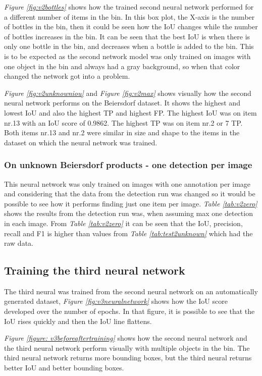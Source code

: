 \textit{Figure \ref{fig:v2bottles}} shows how the trained second neural network performed for a different number of items in the bin. In this box plot, the X-axis is the number of bottles in the bin, then it could be seen how the IoU changes while the number of bottles increases in the bin. It can be seen that the best IoU is when there is only one bottle in the bin, and decreases when a bottle is added to the bin. This is to be expected as the second network model was only trained on images with one object in the bin and always had a gray background, so when that color changed the network got into a problem.

\textit{Figure \ref{fig:v2unknowniou}} and \textit{Figure \ref{fig:v2max}} shows visually how the second neural network performs on the Beiersdorf dataset. It shows the highest and lowest IoU and also the highest TP and highest FP. The highest IoU was on item nr.13 with an IoU score of 0.9862. The highest TP was on item nr.2 or 7 TP. Both items nr.13 and nr.2 were similar in size and shape to the items in the dataset on which the neural network was trained.

\subsubsection{On unknown Beiersdorf products - one detection per image}
This neural network was only trained on images with one annotation per image and considering that the data from the detection run was changed so it would be possible to see how it performs finding just one item per image. \textit{Table \ref{tab:v2zero}} shows the results from the detection run was, when assuming max one detection in each image. From \textit{Table \ref{tab:v2zero}} it can be seen that the IoU, precision, recall and F1 is higher than values from \textit{Table \ref{tab:test2unknown}} which had the raw data.


\subsection{Training the third neural network}
The third neural was trained from the second neural network on an automatically generated dataset, \textit{Figure \ref{fig:v3neuralnetwork}} shows how the IoU score developed over the number of epochs. In that figure, it is possible to see that the IoU rises quickly and then the IoU line flattens.

\textit{Figure \ref{figure: v3beforeaftertraining}} shows how the second neural network and the third neural network perform visually with multiple objects in the bin. The third neural network returns more bounding boxes, but the third neural returns better IoU and better bounding boxes.

